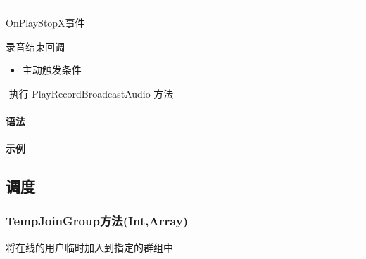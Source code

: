 \documentclass[letterpaper,10pt,english]{sphinxmanual}
\begin{document}
\bigskip\hrule\bigskip




OnPlayStopX事件



录音结束回调
\begin{itemize}
\item {} 
主动触发条件

\end{itemize}

​ 执行 PlayRecordBroadcastAudio 方法


\paragraph{语法}
\label{\detokenize{csharp_activex:id130}}
%
\begin{sphinxVerbatim}[commandchars=\\\{\}]
 
\end{sphinxVerbatim}


\paragraph{示例}
\label{\detokenize{csharp_activex:id131}}
%
\begin{sphinxVerbatim}[commandchars=\\\{\}]
    

\end{sphinxVerbatim}


\subsection{调度}
\label{\detokenize{csharp_activex:id132}}

\subsubsection{TempJoinGroup方法(Int,Array)}
\label{\detokenize{csharp_activex:tempjoingroup-int-array}}
将在线的用户临时加入到指定的群组中
\end{document}
